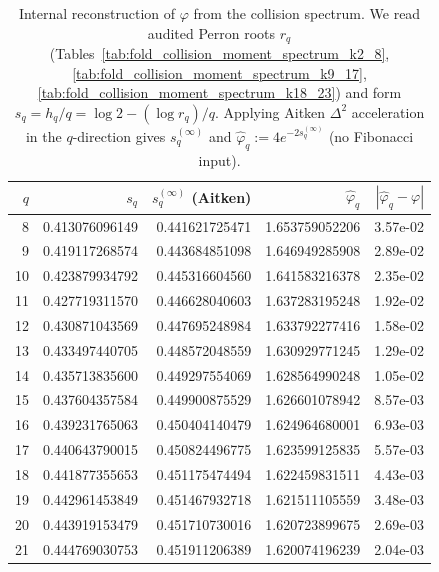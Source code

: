 \begin{table}[H]
\centering
\scriptsize
\setlength{\tabcolsep}{6pt}
\caption{Internal reconstruction of $\varphi$ from the collision spectrum. We read audited Perron roots $r_q$ (Tables~\ref{tab:fold_collision_moment_spectrum_k2_8}, \ref{tab:fold_collision_moment_spectrum_k9_17}, \ref{tab:fold_collision_moment_spectrum_k18_23}) and form $s_q=h_q/q=\log 2-(\log r_q)/q$. Applying Aitken $\Delta^2$ acceleration in the $q$-direction gives $s_q^{(\infty)}$ and $\widehat\varphi_q:=4e^{-2s_q^{(\infty)}}$ (no Fibonacci input).}
\label{tab:fold_collision_phi_reconstruction_from_renyi}
\begin{tabular}{r r r r r}
\toprule
$q$ & $s_q$ & $s_q^{(\infty)}$ (Aitken) & $\widehat\varphi_q$ & $|\widehat\varphi_q-\varphi|$\\
\midrule
8 & 0.413076096149 & 0.441621725471 & 1.653759052206 & 3.57e-02\\
9 & 0.419117268574 & 0.443684851098 & 1.646949285908 & 2.89e-02\\
10 & 0.423879934792 & 0.445316604560 & 1.641583216378 & 2.35e-02\\
11 & 0.427719311570 & 0.446628040603 & 1.637283195248 & 1.92e-02\\
12 & 0.430871043569 & 0.447695248984 & 1.633792277416 & 1.58e-02\\
13 & 0.433497440705 & 0.448572048559 & 1.630929771245 & 1.29e-02\\
14 & 0.435713835600 & 0.449297554069 & 1.628564990248 & 1.05e-02\\
15 & 0.437604357584 & 0.449900875529 & 1.626601078942 & 8.57e-03\\
16 & 0.439231765063 & 0.450404140479 & 1.624964680001 & 6.93e-03\\
17 & 0.440643790015 & 0.450824496775 & 1.623599125835 & 5.57e-03\\
18 & 0.441877355653 & 0.451175474494 & 1.622459831511 & 4.43e-03\\
19 & 0.442961453849 & 0.451467932718 & 1.621511105559 & 3.48e-03\\
20 & 0.443919153479 & 0.451710730016 & 1.620723899675 & 2.69e-03\\
21 & 0.444769030753 & 0.451911206389 & 1.620074196239 & 2.04e-03\\
\bottomrule
\end{tabular}
\end{table}
